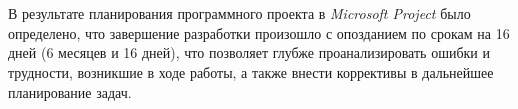 \chapter*{\hfill{}\hfill}

В результате планирования программного проекта в \textit{Microsoft Project} было определено, что завершение разработки произошло с опозданием по срокам на 16 дней (6 месяцев и 16 дней), что позволяет глубже проанализировать ошибки и трудности, возникшие в ходе работы, а также внести коррективы в дальнейшее планирование задач.